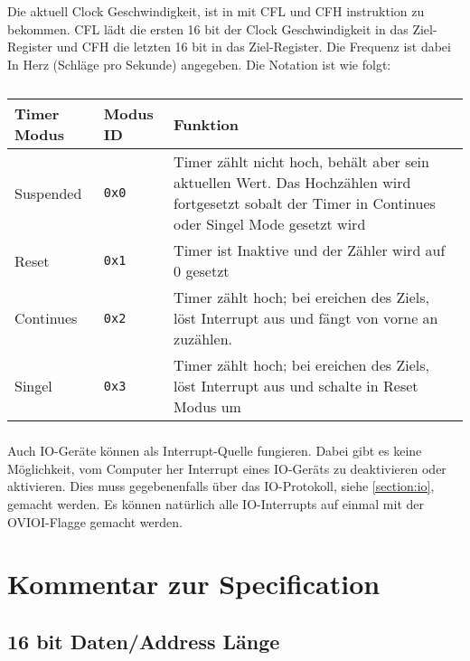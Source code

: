 \documentclass{scrartcl}
\begin{document}
Die aktuell Clock Geschwindigkeit, ist in mit CFL und CFH instruktion zu bekommen. CFL lädt die ersten 16 bit der Clock Geschwindigkeit in das Ziel-Register und CFH die letzten 16 bit in das Ziel-Register. Die Frequenz ist dabei In Herz (Schläge pro Sekunde) angegeben. Die Notation ist wie folgt:



\begin{center}
	\begin{table}
		\caption{\label{table:TimerModi}}
		\begin{tabular}{l  l | L{9cm}}
			Timer Modus & Modus ID & Funktion \\
			\hline
			Suspended & \texttt{0x0} & Timer zählt nicht hoch, behält aber sein aktuellen Wert. Das Hochzählen wird fortgesetzt sobalt der Timer in Continues oder Singel Mode gesetzt wird \\
			Reset & \texttt{0x1} & Timer ist Inaktive und der Zähler wird auf 0 gesetzt \\
			Continues & \texttt{0x2} & Timer zählt hoch; bei ereichen des Ziels, löst Interrupt aus und fängt von vorne an zuzählen. \\
			Singel & \texttt{0x3} & Timer zählt hoch; bei ereichen des Ziels, löst Interrupt aus und schalte in Reset Modus um
		\end{tabular}
	\end{table}
\end{center}

\subsubsection{\label{section:ioInterrupt}}

Auch IO-Geräte können als Interrupt-Quelle fungieren. Dabei gibt es keine Möglichkeit, vom Computer her Interrupt eines IO-Geräts zu deaktivieren oder aktivieren. Dies muss gegebenenfalls über das IO-Protokoll, siehe \autoref{section:io}, gemacht werden. Es können natürlich alle IO-Interrupts auf einmal mit der OVIOI-Flagge gemacht werden.

\section{Kommentar zur Specification}

\subsection{\label{section:comment:datalength}16 bit Daten/Address Länge}
\end{document}
